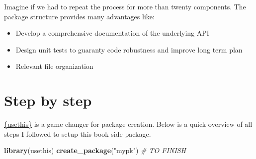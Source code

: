 \documentclass[
]{book}
\newenvironment{Shaded}{\begin{snugshade}}{\end{snugshade}}
\newcommand{\CommentTok}[1]{\textcolor[rgb]{0.56,0.35,0.01}{\textit{#1}}}
\newcommand{\ControlFlowTok}[1]{\textcolor[rgb]{0.13,0.29,0.53}{\textbf{#1}}}
\newcommand{\DecValTok}[1]{\textcolor[rgb]{0.00,0.00,0.81}{#1}}
\newcommand{\KeywordTok}[1]{\textcolor[rgb]{0.13,0.29,0.53}{\textbf{#1}}}
\newcommand{\NormalTok}[1]{#1}
\newcommand{\OperatorTok}[1]{\textcolor[rgb]{0.81,0.36,0.00}{\textbf{#1}}}
\newcommand{\StringTok}[1]{\textcolor[rgb]{0.31,0.60,0.02}{#1}}
\providecommand{\tightlist}{%
  \setlength{\itemsep}{0pt}\setlength{\parskip}{0pt}}
\begin{document}
\begin{Shaded}
\end{Shaded}

Imagine if we had to repeat the process for more than twenty components. The package structure provides many advantages like:

\begin{itemize}
\tightlist
\item
  Develop a comprehensive documentation of the underlying API
\item
  Design unit tests to guaranty code robustness and improve long term plan
\item
  Relevant file organization
\end{itemize}

\hypertarget{step-by-step}{%
\section{Step by step}\label{step-by-step}}

\href{https://usethis.r-lib.org}{\{usethis\}} is a game changer for package creation.
Below is a quick overview of all steps I followed to setup this book side package.

\begin{Shaded}
\begin{Highlighting}[]
\KeywordTok{library}\NormalTok{(usethis)}
\KeywordTok{create_package}\NormalTok{(}\StringTok{"mypk"}\NormalTok{)}
\CommentTok{# TO FINISH}
\end{Highlighting}
\end{Shaded}
\end{document}
